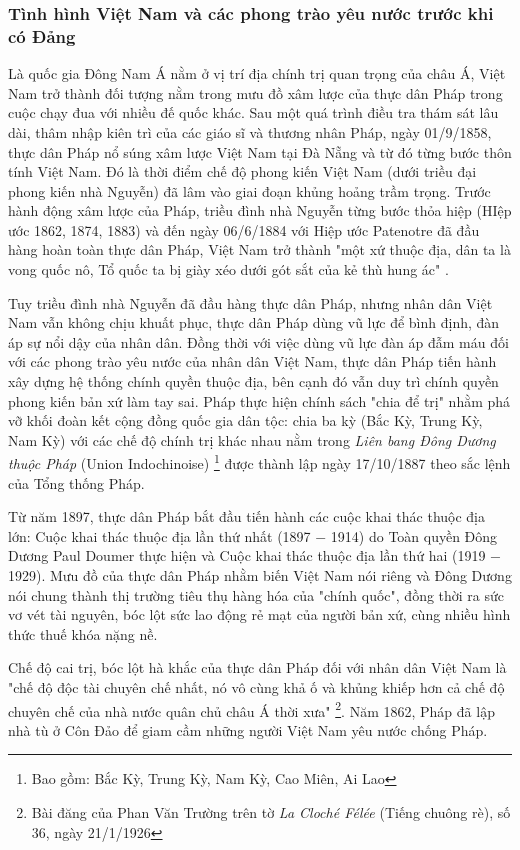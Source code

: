 \subsubsection{Tình hình Việt Nam và các phong trào yêu nước trước khi có Đảng}
Là quốc gia Đông Nam Á nằm ở vị trí địa chính trị quan trọng của châu Á, Việt Nam trở thành đối tượng nằm trong mưu đồ xâm lược của thực dân Pháp trong cuộc chạy đua với nhiều đế quốc khác. Sau một quá trình điều tra thám sát lâu dài, thâm nhập kiên trì của các giáo sĩ và thương nhân Pháp, ngày 01/9/1858, thực dân Pháp nổ súng xâm lược Việt Nam tại Đà Nẵng và từ đó từng bước thôn tính Việt Nam. Đó là thời điểm chế độ phong kiến Việt Nam (dưới triều đại phong kiến nhà Nguyễn) đã lâm vào giai đoạn khủng hoảng trầm trọng. Trước hành động xâm lược của Pháp, triều đình nhà Nguyễn từng bước thỏa hiệp (HIệp ước 1862, 1874, 1883) và đến ngày 06/6/1884 với Hiệp ước Patenotre đã đầu hàng hoàn toàn thực dân Pháp, Việt Nam trở thành "một xứ thuộc địa, dân ta là vong quốc nô, Tổ quốc ta bị giày xéo dưới gót sắt của kẻ thù hung ác" .

Tuy triều đình nhà Nguyễn đã đầu hàng thực dân Pháp, nhưng nhân dân Việt Nam vẫn không chịu khuất phục, thực dân Pháp dùng vũ lực để bình định, đàn áp sự nổi dậy của nhân dân. Đồng thời với việc dùng vũ lực đàn áp đẫm máu đối với các phong trào yêu nước của nhân dân Việt Nam, thực dân Pháp tiến hành xây dựng hệ thống chính quyền thuộc địa, bên cạnh đó vẫn duy trì chính quyền phong kiến bản xứ làm tay sai. Pháp thực hiện chính sách "chia để trị" nhằm phá vỡ khối đoàn kết cộng đồng quốc gia dân tộc: chia ba kỳ (Bắc Kỳ, Trung Kỳ, Nam Kỳ) với các chế độ chính trị khác nhau nằm trong \textit{Liên bang Đông Dương thuộc Pháp} (Union Indochinoise) \footnote{Bao gồm: Bắc Kỳ, Trung Kỳ, Nam Kỳ, Cao Miên, Ai Lao} được thành lập ngày 17/10/1887 theo sắc lệnh của Tổng thống Pháp.

Từ năm 1897, thực dân Pháp bắt đầu tiến hành các cuộc khai thác thuộc địa lớn: Cuộc khai thác thuộc địa lần thứ nhất (1897 $-$ 1914) do Toàn quyền Đông Dương Paul Doumer thực hiện và Cuộc khai thác thuộc địa lần thứ hai (1919 $-$ 1929). Mưu đồ của thực dân Pháp nhằm biến Việt Nam nói riêng và Đông Dương nói chung thành thị trường tiêu thụ hàng hóa của "chính quốc", đồng thời ra sức vơ vét tài nguyên, bóc lột sức lao động rẻ mạt của người bản xứ, cùng nhiều hình thức thuế khóa nặng nề.

Chế độ cai trị, bóc lột hà khắc của thực dân Pháp đối với nhân dân Việt Nam là "chế độ độc tài chuyên chế nhất, nó vô cùng khả ố và khủng khiếp hơn cả chế độ chuyên chế của nhà nước quân chủ châu Á thời xưa" \footnote{Bài đăng của Phan Văn Trường trên tờ \textit{La Cloché Félée} (Tiếng chuông rè), số 36, ngày 21/1/1926}. Năm 1862, Pháp đã lập nhà tù ở Côn Đảo để giam cầm những người Việt Nam yêu nước chống Pháp.

